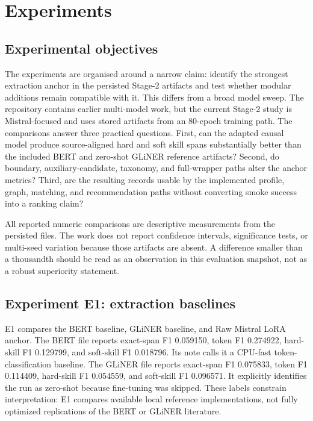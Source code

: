 \chapter{Experiments}
\label{ch:experiments}

\section{Experimental objectives}

The experiments are organised around a narrow claim: identify the strongest extraction anchor in the persisted Stage-2 artifacts and test whether modular additions remain compatible with it. This differs from a broad model sweep. The repository contains earlier multi-model work, but the current Stage-2 study is Mistral-focused and uses stored artifacts from an 80-epoch training path. The comparisons answer three practical questions. First, can the adapted causal model produce source-aligned hard and soft skill spans substantially better than the included BERT and zero-shot GLiNER reference artifacts? Second, do boundary, auxiliary-candidate, taxonomy, and full-wrapper paths alter the anchor metrics? Third, are the resulting records usable by the implemented profile, graph, matching, and recommendation paths without converting smoke success into a ranking claim?

All reported numeric comparisons are descriptive measurements from the persisted files. The work does not report confidence intervals, significance tests, or multi-seed variation because those artifacts are absent. A difference smaller than a thousandth should be read as an observation in this evaluation snapshot, not as a robust superiority statement.

\section{Experiment E1: extraction baselines}

E1 compares the BERT baseline, GLiNER baseline, and Raw Mistral LoRA anchor. The BERT file reports exact-span F1 0.059150, token F1 0.274922, hard-skill F1 0.129799, and soft-skill F1 0.018796. Its note calls it a CPU-fast token-classification baseline. The GLiNER file reports exact-span F1 0.075833, token F1 0.114409, hard-skill F1 0.054559, and soft-skill F1 0.096571. It explicitly identifies the run as zero-shot because fine-tuning was skipped. These labels constrain interpretation: E1 compares available local reference implementations, not fully optimized replications of the BERT or GLiNER literature.

